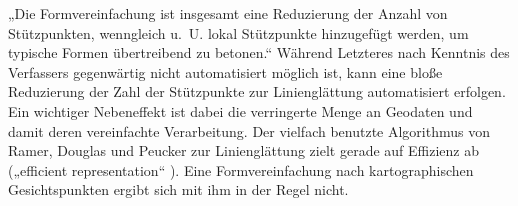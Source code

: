 \documentclass[../main/thesis.tex]{subfiles}
\begin{document}
„Die Formvereinfachung ist insgesamt eine Reduzierung der Anzahl von Stützpunkten, wenngleich u.~U. lokal Stützpunkte hinzugefügt werden, um typische Formen übertreibend zu betonen.“ 
Während Letzteres nach Kenntnis des Verfassers gegenwärtig nicht automatisiert möglich ist, kann eine bloße Reduzierung der Zahl der Stützpunkte zur Linienglättung automatisiert erfolgen.
Ein wichtiger Nebeneffekt ist dabei die verringerte Menge an Geodaten und damit deren vereinfachte Verarbeitung.
Der vielfach benutzte Algorithmus von Ramer, Douglas und Peucker zur Linienglättung zielt gerade auf Effizienz ab („efficient representation“ ).
Eine Formvereinfachung nach kartographischen Gesichtspunkten ergibt sich mit ihm in der Regel nicht.

\end{document}

